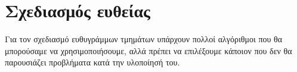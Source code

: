 \section{Σχεδιασμός ευθείας}

Για τον σχεδιασμό ευθυγράμμων τμημάτων υπάρχουν πολλοί αλγόριθμοι που θα μπορούσαμε να χρησιμοποιήσουμε, αλλά πρέπει να επιλέξουμε κάποιον που δεν θα παρουσιάζει προβλήματα κατά την υλοποίησή του.





	


	
\newpage	
	



